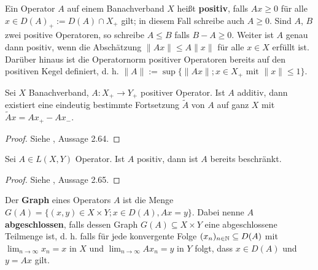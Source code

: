 \par
Ein Operator $A$ auf einem Banachverband $X$ heißt \textbf{positiv}, falls $Ax\geq0$ für alle $x\in D(A)_+:= D(A)\cap X_+$ gilt; in diesem Fall schreibe auch $A\geq0$. Sind $A$, $B$ zwei positive Operatoren, so schreibe $A\leq B$ falls $B-A\geq0$. Weiter ist $A$ genau dann positiv, wenn die Abschätzung $\|Ax\|\leq A\|x\|$ für alle $x\in X$ erfüllt ist. Darüber hinaus ist die Operatornorm positiver Operatoren bereits auf den positiven Kegel definiert, d. h. $\|A\|:=\sup\big\{\|Ax\|;x\in  X_+ \text{ mit }\|x\|\leq 1\big\}$.




\begin{fsatz}\label{Fortsetzung positiver Operatoren}
Sei $X$ Banachverband,  $A\colon X_+\to Y_+$ positiver Operator. Ist $A$ additiv, dann 
existiert eine eindeutig bestimmte Fortsetzung $\widetilde{A}$ von $A$ auf ganz $X$ mit $\widetilde{A}x=Ax_+ - Ax_-$. 
\end{fsatz}

\begin{proof}
Siehe \cite{banasiak_arlotti_2006}, Aussage 2.64.
\end{proof}

\begin{fsatz}
Sei $A\in L(X, Y)$ Operator. Ist $A$ positiv, dann ist $A$ bereits beschränkt.
\end{fsatz}

\begin{proof}
Siehe \cite{banasiak_arlotti_2006}, Aussage 2.65.
\end{proof}

\par
Der \textbf{Graph} eines Operators $A$ ist die Menge $G(A)=\{(x,y)\in X\times Y; x\in D(A), Ax= y\}$.  Dabei nenne $A$ \textbf{abgeschlossen}, falls dessen Graph $G(A)\subseteq X\times Y$ eine abgeschlossene Teilmenge ist, d. h. falls für jede konvergente Folge $(x_n)_{n\in\mathbb{N}}\subseteq D(A)$ mit $\lim_{n\to\infty} x_n = x$ in $X$ und $\lim_{n\to\infty} Ax_n = y$ in $Y$ folgt, dass  $x\in D(A)$ und $y= Ax$ gilt. 

